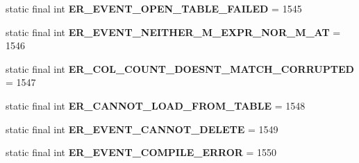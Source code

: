 \begin{DoxyCompactItemize}
\item 
\mbox{\label{classcom_1_1mysql_1_1cj_1_1exceptions_1_1_mysql_error_numbers_a5b7874a8204bd0ae07a43440b2730143}} 
static final int {\bfseries E\+R\+\_\+\+E\+V\+E\+N\+T\+\_\+\+O\+P\+E\+N\+\_\+\+T\+A\+B\+L\+E\+\_\+\+F\+A\+I\+L\+ED} = 1545
\item 
\mbox{\label{classcom_1_1mysql_1_1cj_1_1exceptions_1_1_mysql_error_numbers_a9b44e3cada334fdc2427af288c274d6f}} 
static final int {\bfseries E\+R\+\_\+\+E\+V\+E\+N\+T\+\_\+\+N\+E\+I\+T\+H\+E\+R\+\_\+\+M\+\_\+\+E\+X\+P\+R\+\_\+\+N\+O\+R\+\_\+\+M\+\_\+\+AT} = 1546
\item 
\mbox{\label{classcom_1_1mysql_1_1cj_1_1exceptions_1_1_mysql_error_numbers_a691713eb78937bf66e0730ff15886541}} 
static final int {\bfseries E\+R\+\_\+\+C\+O\+L\+\_\+\+C\+O\+U\+N\+T\+\_\+\+D\+O\+E\+S\+N\+T\+\_\+\+M\+A\+T\+C\+H\+\_\+\+C\+O\+R\+R\+U\+P\+T\+ED} = 1547
\item 
\mbox{\label{classcom_1_1mysql_1_1cj_1_1exceptions_1_1_mysql_error_numbers_ab5a3898e3e8f93f60e2066a141d704a1}} 
static final int {\bfseries E\+R\+\_\+\+C\+A\+N\+N\+O\+T\+\_\+\+L\+O\+A\+D\+\_\+\+F\+R\+O\+M\+\_\+\+T\+A\+B\+LE} = 1548
\item 
\mbox{\label{classcom_1_1mysql_1_1cj_1_1exceptions_1_1_mysql_error_numbers_a9041158b49591f47e7e7cda00a4bf175}} 
static final int {\bfseries E\+R\+\_\+\+E\+V\+E\+N\+T\+\_\+\+C\+A\+N\+N\+O\+T\+\_\+\+D\+E\+L\+E\+TE} = 1549
\item 
\mbox{\label{classcom_1_1mysql_1_1cj_1_1exceptions_1_1_mysql_error_numbers_afbb47c43de07182213cdb3e0c3dedafc}} 
static final int {\bfseries E\+R\+\_\+\+E\+V\+E\+N\+T\+\_\+\+C\+O\+M\+P\+I\+L\+E\+\_\+\+E\+R\+R\+OR} = 1550
\item 
\mbox{\label{classcom_1_1mysql_1_1cj_1_1exceptions_1_1_mysql_error_numbers_ac0ab3c14a7fef8fb5c6d87f445bf35f2}} 

\end{DoxyCompactItemize}
